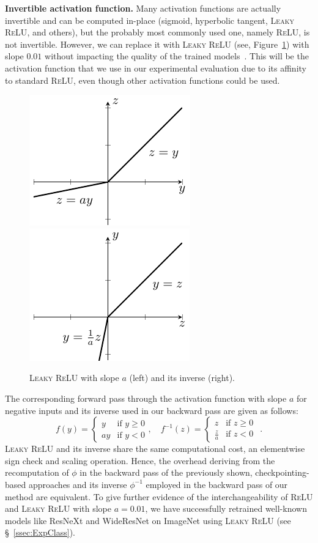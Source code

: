\documentclass[10pt,twocolumn,letterpaper]{article}
\newcommand{\myparagraph}[1]{\vspace{5pt}\noindent\textbf{#1}}
\begin{document}
\myparagraph{Invertible activation function.} Many activation functions are actually invertible and can be computed in-place (\eg sigmoid, hyperbolic tangent, \textsc{Leaky ReLU}, and others), but the probably most commonly used one, namely \textsc{ReLU}, is not invertible. However, we can replace it with \textsc{Leaky ReLU} (see, Figure~\ref{fig:lrelu}) with slope $0.01$ without impacting the quality of the trained models~\cite{Xu+15}. This will be the activation function that we use in our experimental evaluation due to its affinity to standard \textsc{ReLU}, even though other activation functions could be used.
\begin{figure}[htb]
	\centering
	\includegraphics[width=.49\columnwidth]{lrelu.pdf}
	\includegraphics[width=.49\columnwidth]{invlrelu.pdf}
	\caption{\textsc{Leaky ReLU} with slope $a$ (left) and its inverse (right).}
	\label{fig:lrelu}
	\vspace{-5pt}
\end{figure}
The corresponding forward pass through the activation function with slope $a$ for negative inputs and its inverse used in our backward pass are given as follows:
\[
	f(y)=
\begin{cases}
	y&\text{if }y\geq 0\\
	ay&\text{if }y<0
\end{cases},\quad
f^{-1}(z)=
\begin{cases}
	z&\text{if }z\geq 0\\
	\frac{z}{a}&\text{if }z<0\
\end{cases}\,.
\]
\textsc{Leaky ReLU} and its inverse share the same computational cost, \ie an elementwise sign check and scaling operation. Hence, the overhead deriving from the recomputation of $\phi$ in the backward pass of the previously shown, checkpointing-based approaches and its inverse $\phi^{-1}$ employed in the backward pass of our method are equivalent. To give further evidence of the interchangeability of \textsc{ReLU} and \textsc{Leaky ReLU} with slope $a=0.01$, we have successfully retrained well-known models like ResNeXt and WideResNet on ImageNet using \textsc{Leaky ReLU} (see \S~\ref{ssec:ExpClass}).
\end{document}
